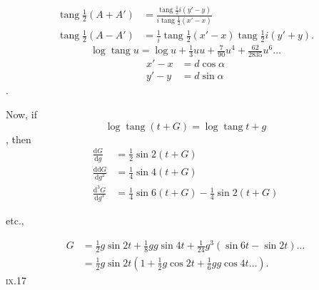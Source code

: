 \[
\begin{aligned}
\operatorname{tang}\tfrac12(A+A')&=
\frac{\operatorname{tang}\tfrac12 i(y'-y)}{i\operatorname{tang}\tfrac12(x'-x)}\\
\operatorname{tang}\tfrac12(A-A')&=\frac1i\operatorname{tang}\tfrac12(x'-x)
 \operatorname{tang}\tfrac12 i(y'+y).
\end{aligned}
\]
\noindent [Since]
\[
\log\operatorname{tang}u=\log u+\tfrac13uu+\tfrac7{90}u^4+\tfrac{62}{2835}u^6\ldots
\]
\[
\begin{aligned}
x'-x&=d\cos\alpha\\
y'-y&=d\sin\alpha
\end{aligned}
\]
.

Now, if
\[
\log\operatorname{tang}(t+G)=\log\operatorname{tang}t+g
\]
\noindent [holds], then
\[
\begin{aligned}
\frac{\mathrm dG}{\mathrm dg}&=\tfrac12\sin2(t+G)\\
\frac{\mathrm d\mathrm dG}{\mathrm dg^2}&=\tfrac14\sin4(t+G)\\
\frac{\mathrm d^3G}{\mathrm dg^3}&=\tfrac14\sin6(t+G)-\tfrac14\sin2(t+G)
\end{aligned}
\]
\centerline{etc.,}
\medskip
\noindent [hence]
\[
\begin{aligned}
G&=\tfrac12g\sin2t+\tfrac18gg\sin4t+\tfrac1{24}g^3(\sin6t-\sin2t)\ldots\\
 &=\tfrac12g\sin2t(1+\tfrac12g\cos2t+\tfrac16gg\cos4t\ldots).
\end{aligned}
\]
\noindent\textsc{ix.}\hfill 17\hspace*{.13\linewidth}\par

